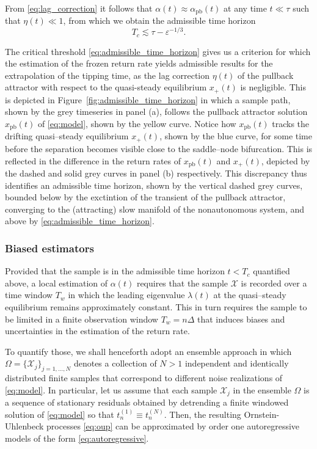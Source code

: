 \documentclass[openacc]{rsproca_new}
\begin{document}
From \eqref{eq:lag_correction} it follows that $\alpha(t)\approx \alpha_{\mathrm{pb}}(t)$ at any time $t\ll\tau$ such that $\eta(t)\ll1$, from which we obtain the admissible time horizon
%
\begin{equation}\label{eq:admissible_time_horizon}
  T_c \lesssim\tau - \varepsilon^{-1/3} .
\end{equation}

The critical threshold \eqref{eq:admissible_time_horizon} gives us a criterion for which the estimation of the frozen return rate yields admissible results for the extrapolation of the tipping time, as the lag correction $\eta(t)$ of the pullback attractor with respect to the quasi-steady equilibrium $x_+(t)$ is negligible. 
This is depicted in Figure~\ref{fig:admissible_time_horizon} in which a sample path, shown by the grey timeseries in panel (a), follows the pullback attractor solution $x_{\mathrm{pb}}(t)$ of \eqref{eq:model}, shown by the yellow curve. 
Notice how $x_{\mathrm{pb}}(t)$ tracks the drifting quasi--steady equilibrium $x_+(t)$, shown by the blue curve, for some time before the separation becomes visible close to the saddle--node bifurcation.
This is reflected in the difference in the return rates of $x_{\mathrm{pb}}(t)$ and $x_+(t)$, depicted by the dashed and solid grey curves in panel (b) respectively.
This discrepancy thus identifies an admissible time horizon, shown by the vertical dashed grey curves, bounded below by the exctintion of the transient of the pullback attractor, converging to the (attracting) slow manifold of the nonautonomous system, and above by \eqref{eq:admissible_time_horizon}.

\subsubsection{Biased estimators}\label{subsubsec:effects}
Provided that the sample is in the admissible time horizon $t<T_c$ quantified above, a local estimation of $\alpha(t)$ requires that the sample $\mathcal{X}$ is recorded over a time window $T_w$ in which the leading eigenvalue $\lambda(t)$ at the quasi--steady equilibrium remains approximately constant.
This in turn requires the sample to be limited in a finite observation window $T_w=n\Delta$ that induces biases and uncertainties in the estimation of the return rate.

To quantify those, we shall henceforth adopt an ensemble approach in which $\Omega = \{\mathcal{X}_{j}\}_{j=1,\dots,N}$ denotes a collection of $N>1$ independent and identically distributed finite samples that correspond to different noise realizations of \eqref{eq:model}.
In particular, let us assume that each sample $\mathcal{X}_j$ in the ensemble $\Omega$ is a sequence of stationary residuals obtained by detrending a finite windowed solution of \eqref{eq:model} so that $t^{(1)}_n\equiv t^{(N)}_n$.
Then, the resulting Ornstein-Uhlenbeck processes \eqref{eq:oup} can be approximated by order one autoregressive models of the form \eqref{eq:autoregressive}.
\end{document}
